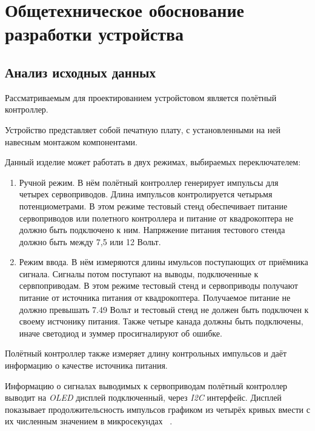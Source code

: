 \section{Общетехническое обоснование разработки устройства}


\subsection{Анализ исходных данных}

Рассматриваемым для проектированием устройстовом является полётный
контроллер.

Устройство представляет собой печатную плату, с установленными на ней
навесным монтажом компонентами.


Данный изделие может работать в двух режимах, выбираемых
переключателем:

\begin{enumerate} 
  
\item Ручной режим. В нём полётный контроллер генерирует импульсы для
четырех сервоприводов. Длина импульсов контролируется четырьмя
потенциометрами. В этом режиме тестовый стенд обеспечивает питание
сервоприводов или полетного контроллера и питание от квадрокоптера не
должно быть подключено к ним. Напряжение питания тестового стенда
должно быть между 7,5 или 12 Вольт.
  
\item Режим ввода. В нём измеряются длины имульсов поступающих от
приёмника сигнала. Сигналы потом поступают на выводы, подключенные к
сервпоприводам.  В этом режиме тестовый стенд и сервоприводы получают
питание от источника питания от квадрокоптера. Получаемое питание не
должно превышать 7.49 Вольт и тестовый стенд не должен быть подключен
к своему истчонику питания. Также четыре канада должны быть
подключены, иначе светодиод и зуммер просигналируют об ошибке.

\end{enumerate}

Полётный контроллер также измеряет длину контрольных импульсов и даёт
информацию о качестве источника питания.

Информацию о сигналах выводимых к сервоприводам полётный контроллер
выводит на \textit{OLED} дисплей подключенный, через \textit{I2C}
интерфейс.  Дисплей показывает продолжительсность импульсов графиком
из четырёх кривых вмести с их численным значением в микросекундах
~\cite{Elector521}.

